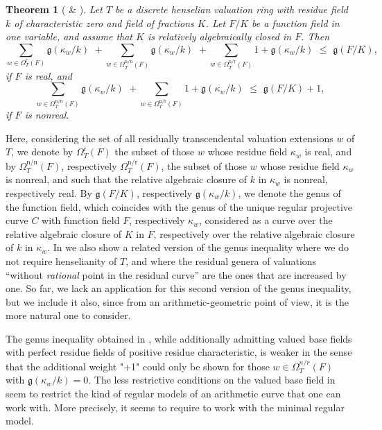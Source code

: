 \documentclass[a4paper,12pt,reqno]{amsart}
\newtheorem*{thm*}{Theorem}
\theoremstyle{definition}
\numberwithin{equation}{thm}
\renewcommand{\leq}{\leqslant}
\begin{document}
\begin{thm*}[ \& ] Let $T$ be a discrete henselian valuation ring with residue field $k$ of characteristic zero and field of fractions $K$. 
Let $F/K$ be a function field in one variable, and assume that $K$ is relatively algebraically closed in $F$. 
Then
$$\sum_{w \in \Omega^{\text{r}}_T(F)} \mathfrak{g}(\kappa_w/k) \,\, + \sum_{w \in \Omega^{\text{n}/\text{n}}_T(F)} \mathfrak{g}(\kappa_w/k) \,\, +  \sum_{w \in \Omega^{\text{n/r}}_T(F)} \!\!1+ \mathfrak{g}(\kappa_w/k) \,\, \leq \,\, \mathfrak{g}(F/K),$$
if $F$ is real, and 
$$\sum_{w \in \Omega^{\text{n}/\text{n}}_T(F)} \mathfrak{g}(\kappa_w/k) \,\,+ \sum_{w \in \Omega^{\text{n/r}}_T(F)} \!\!1+ \mathfrak{g}(\kappa_w/k) \,\, \leq \,\, \mathfrak{g}(F/K) + 1,$$
if $F$ is nonreal.
\end{thm*}

Here, considering the set of all residually transcendental valuation extensions $w$ of $T$, we denote by $\Omega^{\text{r}}_T(F)$ the subset of those $w$ whose residue field $\kappa_w$ is real, and by $\Omega^{\text{n/n}}_T(F)$, respectively $\Omega^{\text{n/r}}_T(F)$,  the subset of those $w$ whose residue field $\kappa_w$ is nonreal, and such that the relative algebraic closure of $k$ in $\kappa_w$ is nonreal, respectively real. By $\mathfrak{g}(F/K)$, respectively $\mathfrak{g}(\kappa_w/k)$, we denote the genus of the function field, which coincides with the genus of the unique regular projective curve $C$ with function field $F$, respectively $\kappa_w$, considered as a curve over the relative algebraic closure of $K$ in $F$, respectively over the relative algebraic closure of $k$ in $\kappa_w$.  In  we also show a related version of the genus inequality where we do not require henselianity of $T$, and where the residual genera of valuations  ``without \textit{rational} point in the residual curve'' are the ones that are increased by one. So far, we lack an application for this second version of the genus inequality, but we include it also, since from an arithmetic-geometric point of view, it is the more natural one to consider.

The genus inequality obtained in \cite{BG24}, while additionally admitting valued base fields with perfect residue fields of positive residue characteristic, 
is weaker in the sense that the additional weight "+1" could only be shown for those $w \in \Omega^{n/r}_T(F)$ with $\mathfrak{g}(\kappa_w/k)=0$.
The less restrictive conditions on the valued base field in \cite{BG24} seem to restrict the kind of regular models of an arithmetic curve that one can work with. More precisely, it seems to require to work with the minimal regular model.
\end{document}
